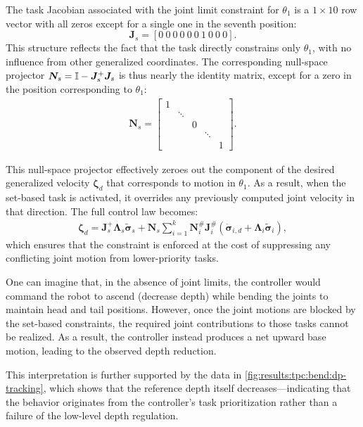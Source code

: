 The task Jacobian associated with the joint limit constraint for \(\theta_1\) is a \(1 \times 10\) row vector with all zeros except for a single one in the seventh position:
\[
\bm{J}_s = [0\ 0\ 0\ 0\ 0\ 0\ 1\ 0\ 0\ 0].
\]
This structure reflects the fact that the task directly constrains only \(\theta_1\), with no influence from other generalized coordinates. The corresponding null-space projector \(\bm{N}_s = \mathbb{I} - \bm{J}_s^{+} \bm{J}_s\) is thus nearly the identity matrix, except for a zero in the position corresponding to \(\theta_1\):
\begin{align}
\bm{N}_s = 
\begin{bmatrix}
1 &   &        &        &  \\
  & \ddots &        &        & \\
  &   & 0      &        &\\
  &   &        & \ddots      & \\
  &   &        &        & 1
\end{bmatrix}.
\end{align}

This null-space projector effectively zeroes out the component of the desired generalized velocity \(\bm{\zeta}_d\) that corresponds to motion in \(\theta_1\). As a result, when the set-based task is activated, it overrides any previously computed joint velocity in that direction. The full control law becomes:
\begin{align}
    \bm{\zeta}_d = \bm{J}_s^{+}\bm{\Lambda}_s \tilde{\bm{\sigma}}_s + \bm{N}_s \sum_{i=1}^k \bm{N}_i^{\#}\bm{J}_i^{\#} \left(\dot{\bm{\sigma}}_{i,d} + \bm{\Lambda}_i \tilde{\bm{\sigma}}_i\right),
\end{align}
which ensures that the constraint is enforced at the cost of suppressing any conflicting joint motion from lower-priority tasks.

One can imagine that, in the absence of joint limits, the controller would command the robot to ascend (decrease depth) while bending the joints to maintain head and tail positions. However, once the joint motions are blocked by the set-based constraints, the required joint contributions to those tasks cannot be realized. As a result, the controller instead produces a net upward base motion, leading to the observed depth reduction.

This interpretation is further supported by the data in \autoref{fig:results:tpc:bend:dp-tracking}, which shows that the reference depth itself decreases—indicating that the behavior originates from the controller’s task prioritization rather than a failure of the low-level depth regulation.


